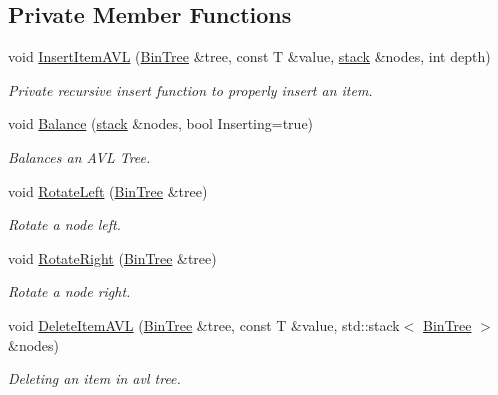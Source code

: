 \subsection*{Private Member Functions}
\begin{DoxyCompactItemize}
\item 
void \hyperlink{classAVLTree_ac19c4e70e093422cee80fc0ba3e22f4e}{Insert\-Item\-A\-V\-L} (\hyperlink{classBSTree_ae961195e523a45be64a981840e953b67}{Bin\-Tree} \&tree, const T \&value, \hyperlink{classAVLTree_a787ae799f7ceb9c9dc8d35b58207479b}{stack} \&nodes, int depth)
\begin{DoxyCompactList}\small\item\em Private recursive insert function to properly insert an item. \end{DoxyCompactList}\item 
void \hyperlink{classAVLTree_ad6178d2397e2ebbadacdbff42686e5dd}{Balance} (\hyperlink{classAVLTree_a787ae799f7ceb9c9dc8d35b58207479b}{stack} \&nodes, bool Inserting=true)
\begin{DoxyCompactList}\small\item\em Balances an A\-V\-L Tree. \end{DoxyCompactList}\item 
void \hyperlink{classAVLTree_a148755819d554e81505d952c7dd35f03}{Rotate\-Left} (\hyperlink{classBSTree_ae961195e523a45be64a981840e953b67}{Bin\-Tree} \&tree)
\begin{DoxyCompactList}\small\item\em Rotate a node left. \end{DoxyCompactList}\item 
void \hyperlink{classAVLTree_a111e0d371175d4c4c4e1560cfe8172b1}{Rotate\-Right} (\hyperlink{classBSTree_ae961195e523a45be64a981840e953b67}{Bin\-Tree} \&tree)
\begin{DoxyCompactList}\small\item\em Rotate a node right. \end{DoxyCompactList}\item 
void \hyperlink{classAVLTree_ad51f5fe9ab61c0d207c326c36b3a7cce}{Delete\-Item\-A\-V\-L} (\hyperlink{classBSTree_ae961195e523a45be64a981840e953b67}{Bin\-Tree} \&tree, const T \&value, std\-::stack$<$ \hyperlink{classBSTree_ae961195e523a45be64a981840e953b67}{Bin\-Tree} $>$ \&nodes)
\begin{DoxyCompactList}\small\item\em Deleting an item in avl tree. \end{DoxyCompactList}\item 

\end{DoxyCompactItemize}
